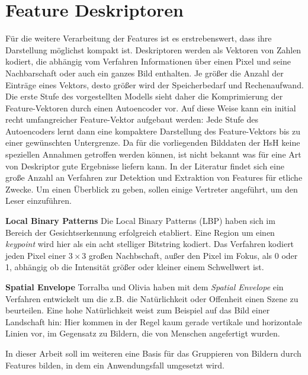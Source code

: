 \section{Feature Deskriptoren}
\label{extraction}

Für die weitere Verarbeitung der Features ist es erstrebenswert, dass ihre Darstellung möglichst kompakt ist. Deskriptoren werden als Vektoren von Zahlen kodiert, die abhängig vom Verfahren Informationen über einen Pixel und seine Nachbarschaft oder auch ein ganzes Bild enthalten. Je größer die Anzahl der Einträge eines Vektors, desto größer wird der Speicherbedarf und Rechenaufwand.
Die erste Stufe des vorgestellten Modells sieht daher die Komprimierung der Feature-Vektoren durch einen Autoencoder vor. Auf diese Weise kann ein initial recht umfangreicher Feature-Vektor aufgebaut werden: Jede Stufe des Autoencoders lernt dann eine kompaktere Darstellung des Feature-Vektors bis zu einer gewünschten Untergrenze.\newline
Da für die vorliegenden Bilddaten der HsH keine speziellen Annahmen getroffen werden können, ist nicht bekannt was für eine Art von Deskriptor gute Ergebnisse liefern kann. In der Literatur findet sich eine große Anzahl an Verfahren zur Detektion und Extraktion von Features für etliche Zwecke. Um einen Überblick zu geben, sollen einige Vertreter angeführt, um den Leser einzuführen.
\newline 

\textbf{Local Binary Patterns} Die Local Binary Patterns (LBP) haben sich im Bereich der Gesichtserkennung erfolgreich etabliert. Eine Region um einen \textit{keypoint} wird hier als ein acht stelliger Bitstring kodiert. Das Verfahren kodiert jeden Pixel einer $3 \times 3$ großen Nachbschaft, außer den Pixel im Fokus, als 0 oder 1, abhängig ob die Intensität größer oder kleiner einem Schwellwert ist.\newline 

\textbf{Spatial Envelope} Torralba und Olivia \cite{mts2001} haben mit dem  \textit{Spatial Envelope} ein Verfahren entwickelt um die z.B. die Natürlichkeit oder Offenheit einen Szene zu beurteilen. Eine hohe Natürlichkeit weist zum Beispiel auf das Bild einer Landschaft hin: Hier kommen in der Regel kaum gerade vertikale und horizontale Linien vor, im Gegensatz zu Bildern, die von Menschen angefertigt wurden.\newline

\newline

\newline

In dieser Arbeit soll im weiteren eine Basis für das Gruppieren von Bildern durch Features bilden, in dem ein Anwendungsfall umgesetzt wird. 